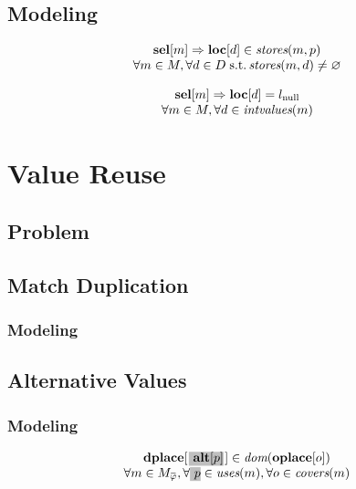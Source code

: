\subsection{Modeling}

\begin{equation}
  \begin{array}{c}
    \mVar{sel}[m]
    \mImp
    \mVar{loc}[d] \in \mStores(m, p) \\
    \forall m \in \mMatchSet,
    \forall d \in \mDataSet \;\text{s.t.} \mStores(m, d) \neq \mEmptySet
  \end{array}
  \labelEquation{valid-locations}
\end{equation}

\begin{equation}
  \begin{array}{c}
    \mVar{sel}[m]
    \mImp
    \mVar{loc}[d] = \mNullLocation \\
    \forall m \in \mMatchSet,
    \forall d \in \mIntValues(m)
  \end{array}
  \labelEquation{locs-of-intermediate-values}
\end{equation}



\section{Value Reuse}
\subsection{Problem}
\subsection{Match Duplication}
\subsubsection{Modeling}
\subsection{Alternative Values}
\subsubsection{Modeling}

\begin{equation}
  \begin{array}{c}
    \mVar{dplace}[\hlDiff{\mVar{alt}[p]}[1pt]] \in \mDom(\mVar{oplace}[o]) \\
    \forall m \in \mMatchCompSet{\mPhi},
    \forall \hlDiff{p} \in \mUses(m),
    \forall o \in \mCovers(m)
  \end{array}
  \labelEquation{dom-alt}
\end{equation}

